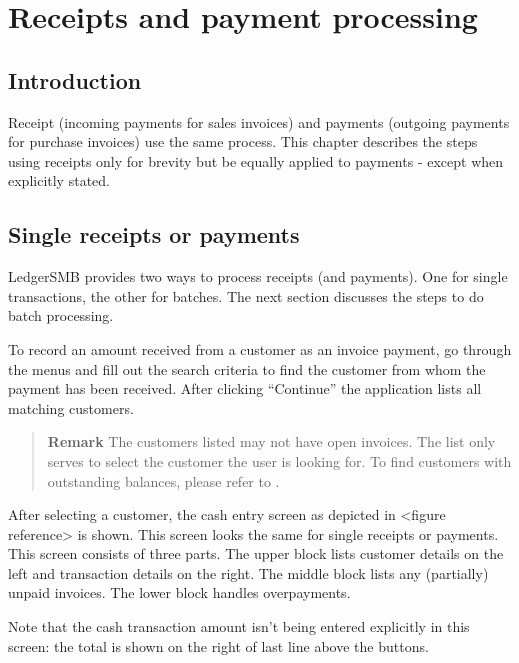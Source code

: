 \chapter{Receipts and payment processing}
\label{cha-workflows-payment-processing}

\section{Introduction}
\label{sec-workflows-payment-processing-introduction}

Receipt (incoming payments for sales invoices) and payments (outgoing payments
for purchase invoices) use the same process. This chapter describes the steps
using receipts only for brevity but be equally applied to payments - except
when explicitly stated.

\section{Single receipts or payments}
\label{sec-workflows-payment-processing-single-payments}

LedgerSMB provides two ways to process receipts (and payments). One for single transactions,
the other for batches. The next section discusses the steps to do batch processing.

To record an amount received from a customer as an invoice payment, go through the menus
 and fill out the search criteria to find the customer from whom
the payment has been received. After clicking ``Continue'' the application lists all matching
customers.

\begin{quotation}
\textbf{Remark} The customers listed may not have open invoices. The list only serves to select
the customer the user is looking for. To find customers with outstanding balances, please refer to
.
\end{quotation}

After selecting a customer, the cash entry screen as depicted in <figure reference> is shown. This
screen looks the same for single receipts or payments. This screen consists of three parts. The upper
block lists customer details on the left and transaction details on the right. The middle block lists
any (partially) unpaid invoices. The lower block handles overpayments.

Note that the cash transaction amount isn't being entered explicitly in this screen: the total
is shown on the right of last line above the buttons.

